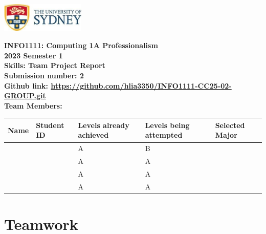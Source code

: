 \documentclass[a4paper, 11pt]{report}
\begin{document}
\begin{titlepage}
\begin{flushright}
\includegraphics[width=4cm]{USyd}\\[2cm]
\end{flushright}
\center 
\textbf{\huge INFO1111: Computing 1A Professionalism}\\[0.75cm]
\textbf{\huge 2023 Semester 1}\\[2cm]
\textbf{\huge Skills: Team Project Report}\\[3cm]

\textbf{\huge Submission number: 2}\\[0.75cm]
\textbf{Github link: \url{https://github.com/hlia3350/INFO1111-CC25-02-GROUP.git}}\\[0.75cm]
\textbf{\huge Team Members:}\\[0.75cm]

\begin{tabular}{|p{}|p{}|p{}|p{}|p{}|}
	\hline
	Name & Student ID & \raggedright{Levels already achieved} & \raggedright{Levels being attempted} & Selected Major \\
	\hline
	\hline
	\raggedright{\studA} & \sidA & A & B & \majC \\
	\raggedright{\studB} & \sidB & A & A & \majB \\
	\raggedright{\studC} & \sidC & A & A & \majA \\
	\raggedright{\studD} & \sidD & A & A & \majD \\
	\hline
\end{tabular}
\thispagestyle{empty}
\end{titlepage}



\tableofcontents






\newpage
\section{Teamwork}
\label{sect-team}
\end{document}
